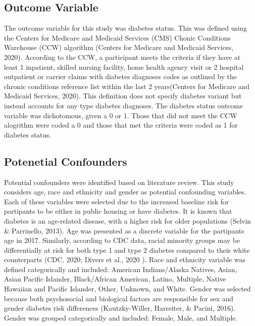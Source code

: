 \documentclass [11pt, proquest] {uwthesis}[2015/03/03]
\begin{document}
\subsection{Outcome Variable}\label{outcome-variable}

The outcome variable for this study was diabetes status. This was
defined using the Centers for Medicare and Medicaid Services (CMS)
Chonic Conditions Warehouse (CCW) algorithm (Centers for Medicare and
Medicaid Services, 2020). According to the CCW, a participant meets the
criteria if they have at least 1 inpatient, skilled nursing facility,
home health agency visit or 2 hospital outpatient or carrier claims with
diabetes diagnoses codes as outlined by the chronic conditions reference
list within the last 2 years(Centers for Medicare and Medicaid Services,
2020). This definition does not specify diabetes variant but instead
accounts for any type diabetes diagnoses. The diabetes status outcome
variable was dichotomous, given a 0 or 1. Those that did not meet the
CCW alogrithm were coded a 0 and those that met the criteria were coded
as 1 for diabetes status.

\subsection{Potenetial Confounders}\label{potenetial-confounders}

Potential confounders were identified based on literature review. This
study considers age, race and ethnicity and gender as potential
confounding variables. Each of these variables were selected due to the
increased baseline risk for partipants to be either in public housing or
have diabetes. It is known that diabetes is an age-related disease, with
a higher risk for older populations (Selvin \& Parrinello, 2013). Age
was presented as a discrete variable for the partipants age in 2017.
Similarly, according to CDC data, racial minority groups may be
differentially at risk for both type 1 and type 2 diabetes compared to
their white counterparts (CDC, 2020; Divers et al., 2020 ). Race and
ethnicity variable was defined categorically and included: American
Indians/Alaska Natives, Asian, Asian Pacific Islander, Black/African
American, Latino, Multiple, Native Hawaiian and Pacific Islander, Other,
Unknown, and White. Gender was selected because both psychosocial and
biological factors are responsible for sex and gender diabetes risk
differences (Kautzky-Willer, Harreiter, \& Pacini, 2016). Gender was
grouped categorically and included: Female, Male, and Multiple.
\end{document}
